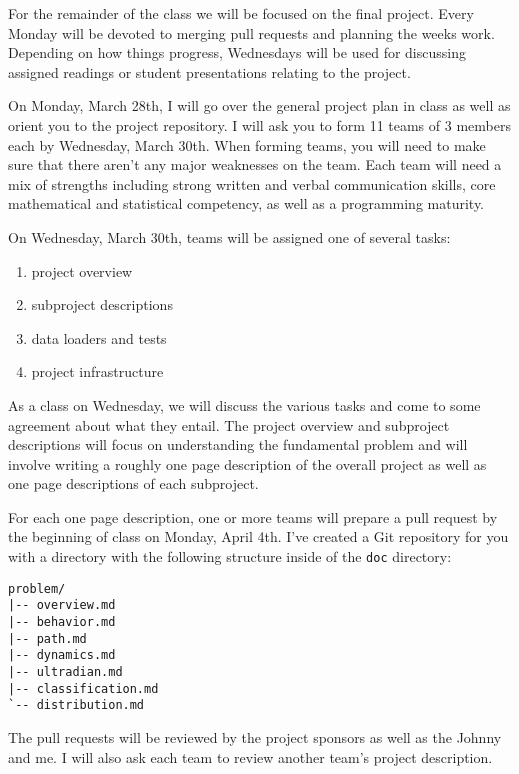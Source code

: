 \documentclass[11pt, oneside]{article}   	%
\begin{document}
For the remainder of the class we will be focused on the final project.  Every
Monday will be devoted to merging pull requests and planning the weeks work.
Depending on how things progress, Wednesdays will be used for discussing
assigned readings or student presentations relating to the project.

On Monday, March 28th, I will go over the general project plan in class as well
as orient you to the project repository.  I will ask you to form 11 teams of 3
members each by Wednesday, March 30th.  When forming teams, you will need to
make sure that there aren't any major weaknesses on the team.  Each team will
need a mix of strengths including strong written and verbal communication
skills, core mathematical and statistical competency, as well as a programming
maturity.

On Wednesday, March 30th, teams will be assigned one of several tasks:

\begin{enumerate}

\item project overview

\item subproject descriptions

\item data loaders and tests

\item project infrastructure

\end{enumerate}

As a class on Wednesday, we will discuss the various tasks and come to some
agreement about what they entail.  The project overview and subproject
descriptions will focus on understanding the fundamental problem and will
involve writing a roughly one page description of the overall project as
well as one page descriptions of each subproject.

For each one page description, one or more teams will prepare a pull request by
the beginning of class on Monday, April 4th.  I've created a Git repository for
you with a directory with the following structure inside of the \texttt{doc}
directory:

\begin{verbatim}
problem/
|-- overview.md
|-- behavior.md
|-- path.md
|-- dynamics.md
|-- ultradian.md
|-- classification.md
`-- distribution.md
\end{verbatim}

The pull requests will be reviewed by the project sponsors as well as the
Johnny and me.  I will also ask each team to review another team's project
description.
\end{document}
